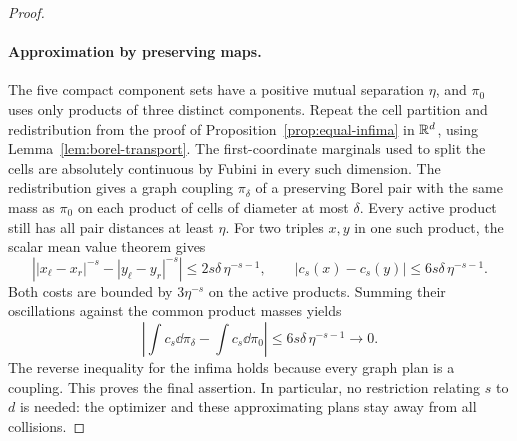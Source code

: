 \begin{proof}
\paragraph{Approximation by preserving maps.}
The five compact component sets have a positive mutual separation
\(\eta\), and \(\pi_0\) uses only products of three distinct components.
Repeat the cell partition and redistribution from the proof of
Proposition~\ref{prop:equal-infima} in \(\mathbb R^d\), using
Lemma~\ref{lem:borel-transport}. The first-coordinate marginals used
to split the cells are absolutely continuous by Fubini in every such
dimension. The redistribution gives a graph coupling
\(\pi_\delta\) of a preserving Borel pair with the same mass as
\(\pi_0\) on each product of cells of diameter at most \(\delta\).
Every active product still has all pair distances at least \(\eta\).
For two triples \(x,y\) in one such product, the scalar mean value
theorem gives
\[
 \left||x_\ell-x_r|^{-s}-|y_\ell-y_r|^{-s}\right|
 \le 2s\delta\,\eta^{-s-1},\qquad
 |c_s(x)-c_s(y)|\le6s\delta\,\eta^{-s-1}.
\]
Both costs are bounded by \(3\eta^{-s}\) on the active products.
Summing their oscillations against the common product masses yields
\[
 \left|\int c_s\dd\pi_\delta-\int c_s\dd\pi_0\right|
 \le6s\delta\,\eta^{-s-1}\longrightarrow0.
\]
The reverse inequality for the infima holds because every graph plan
is a coupling. This proves the final assertion. In particular, no
restriction relating \(s\) to \(d\) is needed: the optimizer and
these approximating plans stay away from all collisions.
\end{proof}
